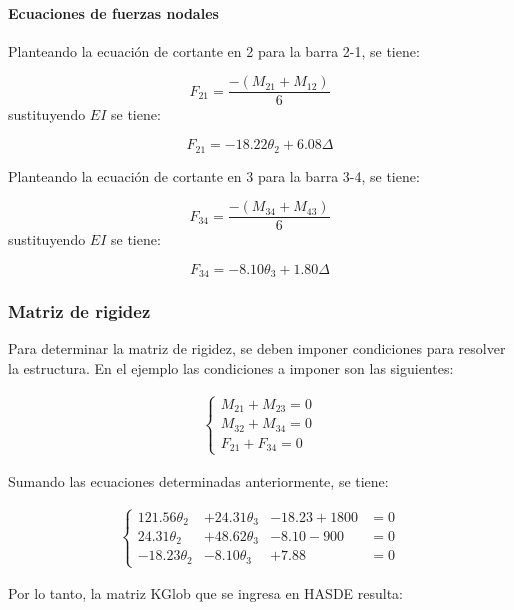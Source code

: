 \paragraph{Ecuaciones de fuerzas nodales}

Planteando la ecuación de cortante en 2 para la barra 2-1, se tiene:

$$
F_{21} = \frac{-(M_{21}+M_{12})}{6}
$$
sustituyendo $EI$ se tiene:

\begin{equation}
\boxed{
	F_{21} = -18.22 \theta_2 + 6.08 \Delta
}
\end{equation}

Planteando la ecuación de cortante en 3 para la barra 3-4, se tiene:

$$
F_{34} = \frac{-(M_{34}+M_{43})}{6}
$$
sustituyendo $EI$ se tiene:

\begin{equation}
\boxed{
	F_{34} = -8.10 \theta_3 + 1.80 \Delta
}
\end{equation}

\subsubsection{Matriz de rigidez}

Para determinar la matriz de rigidez, se deben imponer condiciones para resolver la estructura. En el ejemplo las condiciones a imponer son las siguientes:


\begin{eqnarray}
	\left\lbrace 
	\begin{array}{l}
	M_{21}+M_{23} = 0 \\
	M_{32}+M_{34} = 0 \\
	F_{21}+F_{34} = 0
	\end{array}
\end{eqnarray}

Sumando las ecuaciones determinadas anteriormente, se tiene:

\begin{eqnarray}
	\left\lbrace 
	\begin{array}{llll}
	121.56 \theta_{2} &+ 24.31 \theta_{3} &-18.23 +1800 &= 0\\
	24.31 \theta_{2} &+ 48.62 \theta_{3} &-8.10 -900  &= 0\\
	-18.23 \theta_{2} &-8.10 \theta_{3} &+7.88 &= 0
	\end{array}
\end{eqnarray}

Por lo tanto, la matriz KGlob que se ingresa en HASDE resulta:

